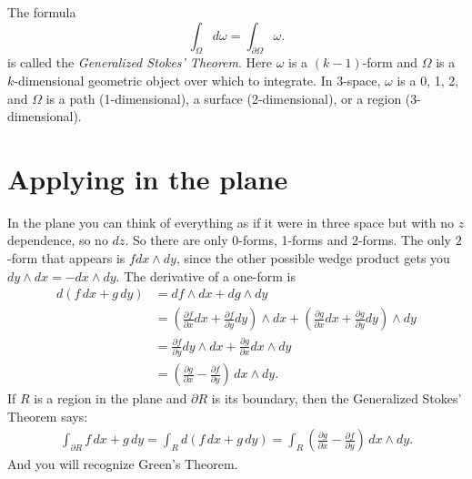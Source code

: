 \documentclass[12pt]{article}
\begin{document}
The formula
$$
\int_\Omega d \omega = \int_{\partial \Omega} \omega .
$$
is called the \emph{Generalized Stokes' Theorem}.  Here $\omega$ is a
$(k-1)$-form and $\Omega$ is a $k$-dimensional geometric object over which to
integrate.  In 3-space, $\omega$ is a 0, 1, 2, and
$\Omega$ is a path (1-dimensional), a surface
(2-dimensional), or a region (3-dimensional).

\section*{Applying in the plane}

In the plane you can think of everything as if it were in three space but
with no $z$ dependence, so no $dz$.  So there are only 0-forms, 1-forms and 2-forms.
The only $2$-form that appears is $f dx \wedge dy$, since
the other possible wedge product gets you $dy \wedge dx = - dx \wedge dy$.
The derivative of a one-form is
\begin{equation*}
\begin{split}
d(f \, dx + g \, dy)
& =
df \wedge dx + dg \wedge dy
\\
& =
\left(\frac{\partial f}{\partial x} dx + \frac{\partial f}{\partial y} dy \right)  \wedge dx
+
\left(\frac{\partial g}{\partial x} dx + \frac{\partial g}{\partial y} dy \right)  \wedge dy
\\
& =
\frac{\partial f}{\partial y} dy \wedge dx
+
\frac{\partial g}{\partial x} dx  \wedge dy
\\
& =
\left(\frac{\partial g}{\partial x} -
\frac{\partial f}{\partial y} \right) \,dx  \wedge dy .
\end{split}
\end{equation*}
If $R$ is a region in the plane and $\partial R$ is its boundary, then
the Generalized Stokes' Theorem says:
\begin{equation*}
\begin{split}
\int_{\partial R}
f \, dx + g \, dy
=
\int_R 
d (f \, dx + g \, dy)
=
\int_R
\left(\frac{\partial g}{\partial x} -
\frac{\partial f}{\partial y} \right) \,dx  \wedge dy .
\end{split}
\end{equation*}
And you will recognize Green's Theorem.
\end{document}
